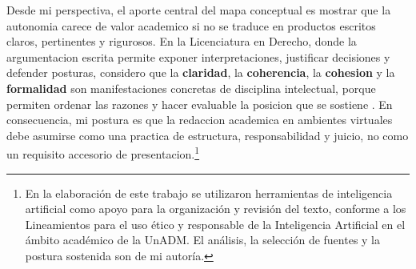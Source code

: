 \documentclass[
	spanish,
	letterpaper, oneside
]{article}
\begin{document}
	Desde mi perspectiva, el aporte central del mapa conceptual es mostrar que la autonomia carece de valor academico si no se traduce en productos escritos claros, pertinentes y rigurosos. En la Licenciatura en Derecho, donde la argumentacion escrita permite exponer interpretaciones, justificar decisiones y defender posturas, considero que la \textbf{claridad}, la \textbf{coherencia}, la \textbf{cohesion} y la \textbf{formalidad} son manifestaciones concretas de disciplina intelectual, porque permiten ordenar las razones y hacer evaluable la posicion que se sostiene \citep{nunezcortesEscrituraAcademicaTeoria2015,correaManualBasicoEscritura2018}. En consecuencia, mi postura es que la redaccion academica en ambientes virtuales debe asumirse como una practica de estructura, responsabilidad y juicio, no como un requisito accesorio de presentacion.\footnote{En la elaboración de este trabajo se utilizaron herramientas de inteligencia artificial como apoyo para la organización y revisión del texto, conforme a los Lineamientos para el uso ético y responsable de la Inteligencia Artificial en el ámbito académico de la UnADM. El análisis, la selección de fuentes y la postura sostenida son de mi autoría.}

% 




\end{document}
